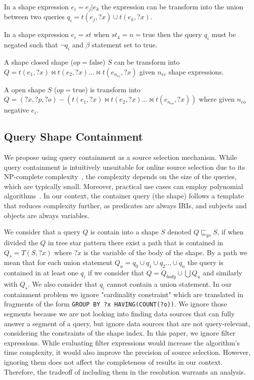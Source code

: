\begin{prop}
   In a shape expression $e_i = e_j|e_k$ the expression can be transform into the union between two queries
   $q_{i} = t(e_j, ?x) \cup t(e_k, ?x)$.
\end{prop}

\begin{prop}
   In a shape expression $e_i = st$ when $st_4 = n = \mathrm{true}$ then the query $q_i$ must be negated such that $\neg q_i$ and $\beta$ statement set to $\mathrm{true}$.
\end{prop}

\begin{prop}
   A shape closed shape ($op = \mathrm{false}$) $S$ can be transform into $Q = t(e_1, ?x) \bowtie t(e_2, ?x) ... \bowtie t(e_{n_{ec}}, ?x)$ given $n_{ec}$ shape expressions.
\end{prop}

\begin{prop}
   A open shape $S$ ($op = \mathrm{true}$) is transform into $Q = (?x, ?p, ?o) -  (t(e_1, ?x) \bowtie  t(e_2, ?x) ... \bowtie t(e_{n_{eo}}, ?x)) $
   where given $n_{eo}$ negative $e_i$.
\end{prop}

\subsection{Query Shape Containment}\label{sec:containment}

We propose using query containment as a source selection mechanism.
While query containment is intuitively unsuitable for online source selection due to its NP-complete complexity~\cite{Spasi2023}, the complexity depends on the size of the queries, which are typically small.
Moreover, practical use cases can employ polynomial algorithms~\cite{Doan2012}.
In our context, the container query (the shape) follows a template that reduces complexity further, as predicates are always IRIs, and subjects and objects are always variables.

We consider that a query $Q$ is contain into a shape $S$ denoted $Q \sqsubseteq_{qs} S$,
if when divided the $Q$ in tree star pattern there exist a path that is contained in $Q_s = T(S, ?x)$ where $?x$ is the variable of the body of the shape.
By a path we mean that for each union statement $Q_u = q_0 \cup q_1 \cup q_2 ... \cup q_n$ the query is contained in at least one $q_i$ if we 
consider that $Q = Q_{body} \cup \bigcup Q_u$ and similarly with $Q_s$.
We also consider that $q_i$ cannot contain a union statement.
In our containment problem we ignore "cardinality constraint" which are translated in 
fragments of the form \texttt{GROUP BY ?x HAVING(COUNT(?o))}.
We ignore those segments because we are not looking into finding data sources that can fully answer a segment of a query,
but ignore data sources that are not query-relevant, considering the constraints of the shape index.
In this paper, we ignore filter expressions.
While evaluating filter expressions would increase the algorithm's time complexity, it would also improve the precision of source selection.
However, ignoring them does not affect the completeness of results in our context.
Therefore, the tradeoff of including them in the resolution warrants an analysis.


